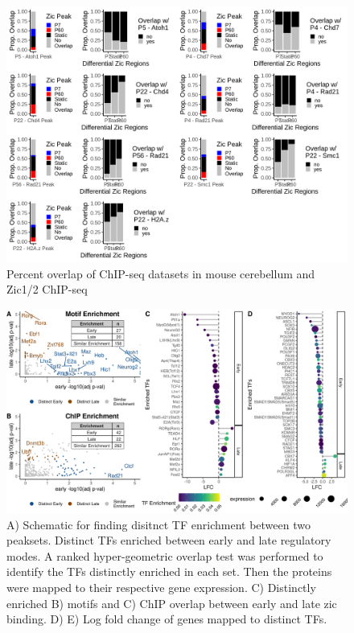 \documentclass[fleqn,10pt,twocolumn]{wlscirep}
\begin{document}
\begin{figure}[ht]
\centering
\includegraphics[width=.95\textwidth]{../figures/supp_figure_chip_overlap.png }
\caption{Percent overlap of ChIP-seq datasets in mouse cerebellum and Zic1/2 ChIP-seq}
\label{fig:chip_overlap}
\end{figure}

\begin{figure}[!ht]
\centering
\includegraphics[width=.95\textwidth]{../figures/figure2_loop.png}
\caption{A) Schematic for finding disitnct TF enrichment between two peaksets. Distinct TFs enriched between early and late regulatory modes. A ranked hyper-geometric overlap test was performed to identify the TFs distinctly enriched in each set. Then the proteins were mapped to their respective gene expression. C) Distinctly enriched B) motifs and C) ChIP overlap between early and late zic binding. D) E) Log fold change of genes mapped to distinct TFs.  }
\label{fig:DistinctTFs_looped}
\end{figure}
\end{document}
